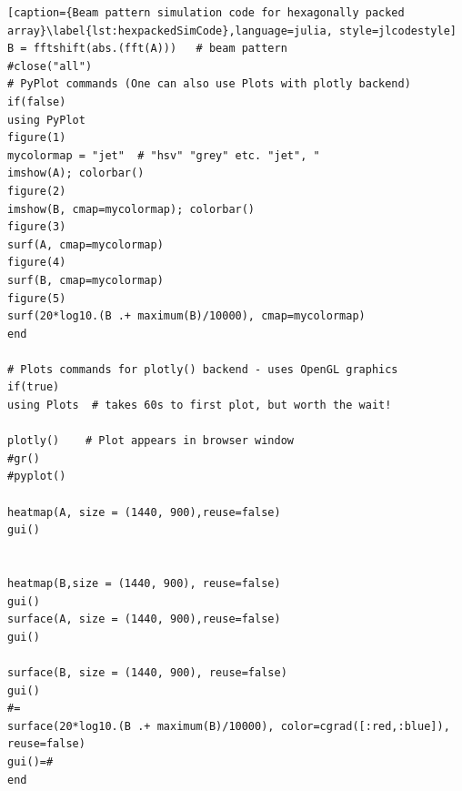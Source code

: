 \begin{appendices}
\begin{lstlisting}[caption={Beam pattern simulation code for hexagonally packed array}\label{lst:hexpackedSimCode},language=julia, style=jlcodestyle]
B = fftshift(abs.(fft(A)))   # beam pattern
#close("all")
# PyPlot commands (One can also use Plots with plotly backend)
if(false)
using PyPlot
figure(1)
mycolormap = "jet"  # "hsv" "grey" etc. "jet", "
imshow(A); colorbar()
figure(2)
imshow(B, cmap=mycolormap); colorbar()
figure(3)
surf(A, cmap=mycolormap)
figure(4)
surf(B, cmap=mycolormap)
figure(5)
surf(20*log10.(B .+ maximum(B)/10000), cmap=mycolormap)
end

# Plots commands for plotly() backend - uses OpenGL graphics
if(true)
using Plots  # takes 60s to first plot, but worth the wait!

plotly()    # Plot appears in browser window
#gr()
#pyplot()

heatmap(A, size = (1440, 900),reuse=false)
gui()


heatmap(B,size = (1440, 900), reuse=false)
gui()
surface(A, size = (1440, 900),reuse=false)
gui()

surface(B, size = (1440, 900), reuse=false)
gui()
#=
surface(20*log10.(B .+ maximum(B)/10000), color=cgrad([:red,:blue]), reuse=false)
gui()=#
end
\end{lstlisting}


\end{appendices}

